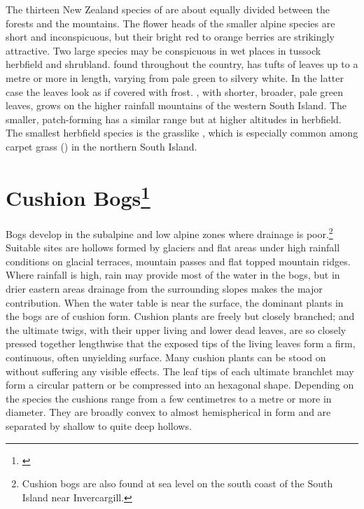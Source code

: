 The thirteen New Zealand species of  are about equally divided between the forests and the mountains.
The flower heads of the smaller alpine species are short and inconspicuous, but their bright red to orange berries are strikingly attractive.
Two large species may be conspicuous in wet places in tussock herbfield and shrubland.  found throughout the country, has tufts of leaves up to a metre or more in length, varying from pale green to silvery white.
In the latter case the leaves look as if covered with frost. , with shorter, broader, pale green leaves, grows on the higher rainfall mountains of the western South Island.
The smaller, patch-forming  has a similar range but at higher altitudes in herbfield.
The smallest herbfield species is the grasslike , which is especially common among carpet grass () in the northern South Island.

\section[Cushion Bogs]{Cushion Bogs\footnote{\cite{gibson1985comparison}}}

Bogs develop in the subalpine and low alpine zones where drainage is poor.\footnote{Cushion bogs are also found at sea level on the south coast of the South Island near Invercargill.}
Suitable sites are hollows formed by glaciers and flat areas under high rainfall conditions on glacial terraces, mountain passes and flat topped mountain ridges.
Where rainfall is high, rain may provide most of the water in the bogs, but in drier eastern areas drainage from the surrounding slopes makes the major contribution.
When the water table is near the surface, the dominant plants in the bogs are of cushion form.
Cushion plants are freely but closely branched; and the ultimate twigs, with their upper living and lower dead leaves, are so closely pressed together lengthwise that the exposed tips of the living leaves form a firm, continuous, often unyielding surface.
Many cushion plants can be stood on without suffering any visible effects.
The leaf tips of each ultimate branchlet may form a circular pattern or be compressed into an hexagonal shape.
Depending on the species the cushions range from a few centimetres to a metre or more in diameter.
They are broadly convex to almost hemispherical in form and are separated by shallow to quite deep hollows.

